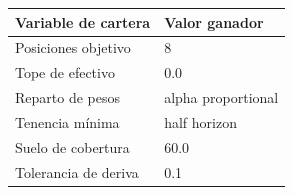 \begin{tabular}{ll}
\toprule
Variable de cartera & Valor ganador \\
\midrule
Posiciones objetivo & 8 \\
Tope de efectivo & 0.0 \\
Reparto de pesos & alpha proportional \\
Tenencia mínima & half horizon \\
Suelo de cobertura & 60.0 \\
Tolerancia de deriva & 0.1 \\
\bottomrule
\end{tabular}
